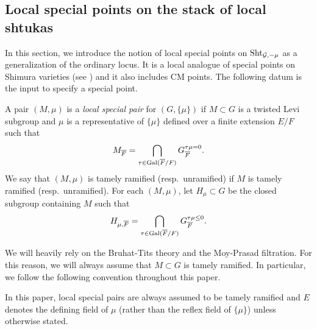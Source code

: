 \documentclass[12pt,reqno]{amsart}
\begin{document}
\subsection{Local special points on the stack of local shtukas} \label{ssec:extremal_points}

In this section, we introduce the notion of local special points on ${\operatorname{Sht}}_{{\mathcal{G}}, -\mu}$ as a generalization of the ordinary locus. It is a local analogue of special points on Shimura varieties (see ) and it also includes CM points. The following datum is the input to specify a special point. 

\begin{defi} \label{defi:local_special_pair}
    A pair $(M, \mu)$ is a \textit{local special pair} for $(G, \{ \mu \})$ if $M \subset G$ is a twisted Levi subgroup and $\mu$ is a representative of $\{ \mu \}$ defined over a finite extension $E / F$ such that 
    \[
        M_{{\overline{F}}} = \bigcap_{\tau \in {\operatorname{Gal}}({\overline{F}} / F)} G_{{\overline{F}}}^{\tau\mu = 0}. 
    \]
    We say that $(M, \mu)$ is tamely ramified (resp.\ unramified) if $M$ is tamely ramified (resp.\ unramified). For each $(M, \mu)$, let $H_\mu \subset G$ be the closed subgroup containing $M$ such that 
    \[
        H_{\mu, {\overline{F}}} = \bigcap_{\tau \in {\operatorname{Gal}}({\overline{F}} / F)} G_{{\overline{F}}}^{\tau\mu \leq 0}.
    \]
\end{defi}

We will heavily rely on the Bruhat-Tits theory and the Moy-Prasad filtration. For this reason, we will always assume that $M  \subset G$ is tamely ramified. In particular, we follow the following convention throughout this paper. 

\begin{conv} \label{conv:tamely_ramified_minimal}
    In this paper, local special pairs are always assumed to be tamely ramified and $E$ denotes the defining field of $\mu$ (rather than the reflex field of $\{ \mu \}$) unless otherwise stated. 
\end{conv}
\end{document}
